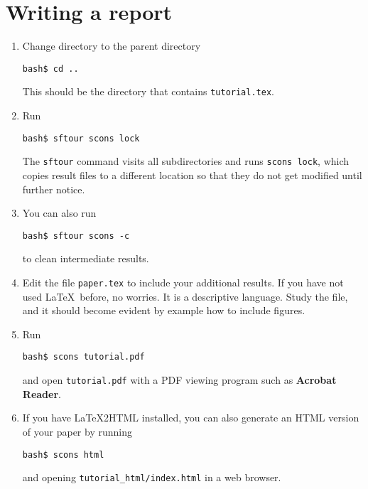 \section{Writing a report}

\begin{enumerate}
\item Change directory to the parent directory
\begin{verbatim}
bash$ cd ..
\end{verbatim}
This should be the directory that contains \texttt{tutorial.tex}.
\item Run
\begin{verbatim}
bash$ sftour scons lock
\end{verbatim}
The \texttt{sftour} command visits all subdirectories and runs \texttt{scons lock}, which copies result files to a different location so that they do not get modified until further notice.
\item You can also run
\begin{verbatim}
bash$ sftour scons -c
\end{verbatim}
to clean intermediate results.
\item Edit the file \texttt{paper.tex} to include your additional results. If you have not used \LaTeX\ before, no worries. It is a descriptive language. Study the file, and it should become evident by example how to include figures.
\item Run
\begin{verbatim}
bash$ scons tutorial.pdf
\end{verbatim}
and open \texttt{tutorial.pdf} with a PDF viewing program such as \textbf{Acrobat Reader}. 

\item If you have \LaTeX2HTML installed, you can also generate an HTML version of your paper by running
\begin{verbatim}
bash$ scons html
\end{verbatim}
and opening \verb#tutorial_html/index.html# in a web browser.
\end{enumerate}

%







